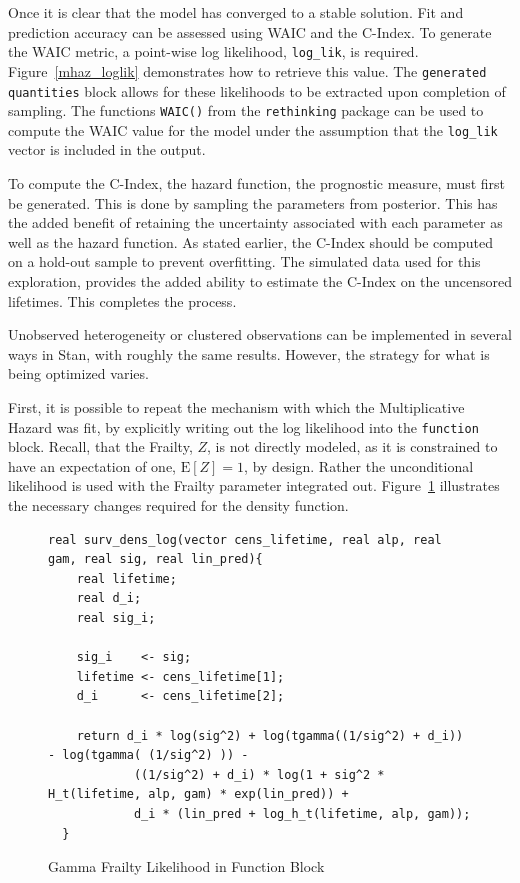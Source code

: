 Once it is clear that the model has converged to a stable solution. Fit and prediction accuracy can be assessed using WAIC and the C-Index. To generate the WAIC metric, a point-wise log likelihood, \lstinline{log_lik}, is required. Figure~\ref{mhaz_loglik} demonstrates how to retrieve this value. The \lstinline{generated quantities} block allows for these likelihoods to be extracted upon completion of sampling. The functions \lstinline{WAIC()} from the \lstinline{rethinking} package can be used to compute the WAIC value for the model under the assumption that the \lstinline{log_lik} vector is included in the output. 

To compute the C-Index, the hazard function, the prognostic measure, must first be generated. This is done by sampling the parameters from posterior. This has the added benefit of retaining the uncertainty associated with each parameter as well as the hazard function. As stated earlier, the C-Index should be computed on a hold-out sample to prevent overfitting. The simulated data used for this exploration, provides the added ability to estimate the C-Index on the uncensored lifetimes. This completes the process.

Unobserved heterogeneity or clustered observations can be implemented in several ways in Stan, with roughly the same results. However, the strategy for what is being optimized varies.

First, it is possible to repeat the mechanism with which the Multiplicative Hazard was fit, by explicitly writing out the log likelihood into the \lstinline{function} block. Recall, that the Frailty, $Z$, is not directly modeled, as it is constrained to have an expectation of one, $\mathrm{E}[Z]=1$, by design. Rather the unconditional likelihood is used with the Frailty parameter integrated out. Figure~\ref{frail_funs} illustrates the necessary changes required for the density function.


\begin{figure}[htbp]
    \centering
    \begin{lstlisting}[belowskip=-2 \baselineskip]
  real surv_dens_log(vector cens_lifetime, real alp, real gam, real sig, real lin_pred){
    real lifetime;
    real d_i;
    real sig_i;

    sig_i    <- sig;
    lifetime <- cens_lifetime[1];
    d_i      <- cens_lifetime[2];
  
    return d_i * log(sig^2) + log(tgamma((1/sig^2) + d_i)) - log(tgamma( (1/sig^2) )) -
            ((1/sig^2) + d_i) * log(1 + sig^2 * H_t(lifetime, alp, gam) * exp(lin_pred)) +
            d_i * (lin_pred + log_h_t(lifetime, alp, gam));
  }\end{lstlisting}
    \caption{Gamma Frailty Likelihood in Function Block}
    \label{frail_funs}
\end{figure}


